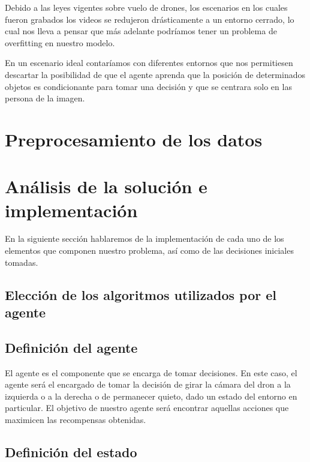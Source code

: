 Debido a las leyes vigentes sobre vuelo de drones, los escenarios en los cuales fueron grabados los videos se redujeron drásticamente a un entorno cerrado, lo cual nos lleva a pensar que más adelante podríamos tener un problema de overfitting en nuestro modelo.
\medskip

En un escenario ideal contaríamos con diferentes entornos que nos permitiesen descartar la posibilidad de que el agente aprenda que la posición de determinados objetos es condicionante para tomar una decisión y que se centrara solo en las persona de la imagen.
\medskip

\section{Preprocesamiento de los datos}
\label{preprocesamiento-datos}


\section{Análisis de la solución e implementación}
\label{analisis-de-la-solucion-e-implementacion}

En la siguiente sección hablaremos de la implementación de cada uno de los elementos que componen nuestro problema, así como de las decisiones iniciales tomadas.
\subsection{Elección de los algoritmos utilizados por el agente}
\label{eleccion-de-algoritmos}

\subsection{Definición del agente}
\label{definicion-del-agente}

El agente es el componente que se encarga de tomar decisiones. En este caso, el agente será el encargado de tomar la decisión de girar la cámara del dron a la izquierda o a la derecha o de permanecer quieto, dado un estado del entorno en particular. El objetivo de nuestro agente será encontrar aquellas acciones que maximicen las recompensas obtenidas.

\subsection{Definición del estado}
\label{definicion-del-estado}

